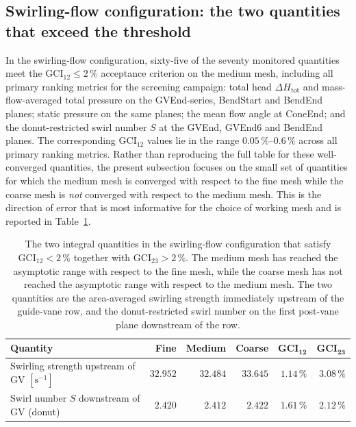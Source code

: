 \subsection{Swirling-flow configuration: the two quantities that exceed the threshold}
\label{sec:gci_swirl}

In the swirling-flow configuration, sixty-five of the seventy monitored quantities meet the $\mathrm{GCI}_{12} \leq 2\,\%$ acceptance criterion on the medium mesh, including all primary ranking metrics for the screening campaign: total head $\Delta H_{\mathrm{tot}}$ and mass-flow-averaged total pressure on the GVEnd-series, BendStart and BendEnd planes; static pressure on the same planes; the mean flow angle at ConeEnd; and the donut-restricted swirl number $S$ at the GVEnd, GVEnd6 and BendEnd planes. The corresponding $\mathrm{GCI}_{12}$ values lie in the range $0.05\,\%$--$0.6\,\%$ across all primary ranking metrics. Rather than reproducing the full table for these well-converged quantities, the present subsection focuses on the small set of quantities for which the medium mesh is converged with respect to the fine mesh while the coarse mesh is \emph{not} converged with respect to the medium mesh. This is the direction of error that is most informative for the choice of working mesh and is reported in Table~\ref{tab:gci_swirl_keep}.

\begin{table}[h!]
  \centering
  \caption[GCI -- swirling-flow configuration: quantities exceeding the $2\,\%$ threshold]{The two integral quantities in the swirling-flow configuration that satisfy $\mathrm{GCI}_{12} < 2\,\%$ together with $\mathrm{GCI}_{23} > 2\,\%$. The medium mesh has reached the asymptotic range with respect to the fine mesh, while the coarse mesh has not reached the asymptotic range with respect to the medium mesh. The two quantities are the area-averaged swirling strength immediately upstream of the guide-vane row, and the donut-restricted swirl number on the first post-vane plane downstream of the row.}
  \label{tab:gci_swirl_keep}
  \small
  \begin{tabular}{l r r r r r}
    \toprule
    \textbf{Quantity}                                            & \textbf{Fine}  & \textbf{Medium} & \textbf{Coarse} & $\mathbf{GCI_{12}}$ & $\mathbf{GCI_{23}}$ \\
    \midrule
    Swirling strength upstream of GV $[\mathrm{s}^{-1}]$         & $32.952$       & $32.484$        & $33.645$        & $1.14\,\%$ & $\mathbf{3.08\,\%}$ \\
    Swirl number $S$ downstream of GV (donut)                    & $2.420$        & $2.412$         & $2.422$         & $1.61\,\%$ & $\mathbf{2.12\,\%}$ \\
    \bottomrule
  \end{tabular}
\end{table}


